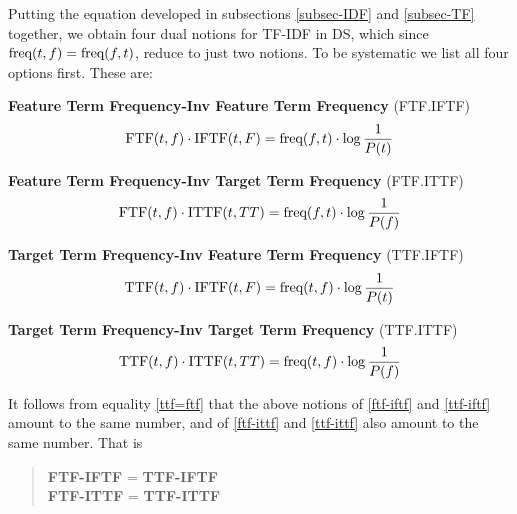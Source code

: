 Putting  the equation developed in subsections \ref{subsec-IDF} and \ref{subsec-TF} together,  we obtain four dual notions  for TF-IDF in DS, which  since $\textmd{freq}(t,f) = \textmd{freq}(f,t)$, reduce to just two notions.  To be systematic we list all four options first. These are:

\begin{definition}
{\bf Feature Term Frequency-Inv Feature Term Frequency} (FTF.IFTF)
\begin{equation}
\label{ftf-iftf}
\textmd{FTF}(t,f) \cdot \textmd{IFTF}(t, F) =  \textmd{freq}(f, t) \cdot \log{\frac{1}{P(t)}}
\end{equation}
\end{definition}



\begin{definition}
{\bf Feature Term Frequency-Inv Target Term Frequency} (FTF.ITTF)
\begin{equation}
\label{ftf-ittf}
\textmd{FTF}(t,f) \cdot \textmd{ITTF}(t, TT) =  \textmd{freq}(f, t) \cdot \log{\frac{1}{P(f)}}
\end{equation}
\end{definition}


\begin{definition}
{\bf Target Term Frequency-Inv Feature Term Frequency} (TTF.IFTF)
\begin{equation}
\label{ttf-iftf}
\textmd{TTF}(t,f) \cdot \textmd{IFTF}(t, F) =  \textmd{freq}(t,f) \cdot \log{\frac{1}{P(t)}}
\end{equation}
\end{definition}

\begin{definition}
{\bf Target Term Frequency-Inv Target Term Frequency} (TTF.ITTF)
\begin{equation}
\label{ttf-ittf}
\textmd{TTF}(t,f) \cdot \textmd{ITTF}(t, TT) =  \textmd{freq}(t, f) \cdot \log{\frac{1}{P(f)}}
\end{equation}
\end{definition}

It follows from equality \ref{ttf=ftf} that the above notions of \ref{ftf-iftf} and \ref{ttf-iftf} amount to the same number, and of \ref{ftf-ittf} and \ref{ttf-ittf} also amount to  the same number.  That is
\begin{quote}
{\bf FTF-IFTF}  = {\bf TTF-IFTF} \\
{\bf FTF-ITTF}  = {\bf TTF-ITTF} 
\end{quote}


